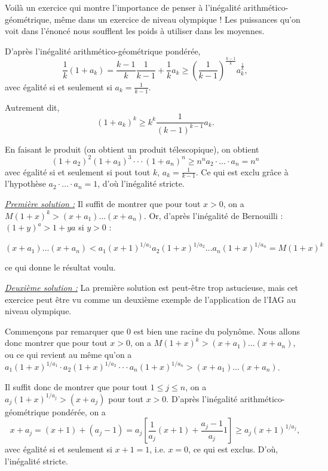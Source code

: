 \begin{sol}
Voilà un exercice qui montre l'importance de penser à l'inégalité arithmético-géométrique, même dans un exercice de niveau olympique ! Les puissances qu'on voit dans l'énoncé nous soufflent les poids à utiliser dans les moyennes.

D'après l'inégalité arithmético-géométrique pondérée,
$$
\frac1{k}(1+a_k) = \frac{k-1}{k} \frac1{k-1} + \frac1{k} a_k \ge \left(\frac1{k-1}\right)^{\frac{k-1}{k}}a_k^{\frac1{k}},
$$
avec égalité si et seulement si $a_k = \frac1{k-1}$.

Autrement dit,
$$
(1+a_k)^k \ge k^k \frac1{(k-1)^{k-1}} a_k.
$$

En faisant le produit (on obtient un produit télescopique), on obtient
$$(1+a_2)^2(1+a_3)^3 \cdot \cdot \cdot (1+a_n)^n \ge n^n a_2 \cdot \dots \cdot a_n = n^n$$
avec égalité si et seulement si pout tout $k$, $a_k = \frac1{k-1}$. Ce qui est exclu grâce à l'hypothèse $a_2 \cdot \dots \cdot a_n =1$, d'où l'inégalité stricte.
\end{sol}


\begin{sol}
\underline{\textit{Première solution :}}
Il suffit de montrer que pour tout $x>0$, on a $M(1+x)^k > (x+a_1) \ldots (x+a_n)$. Or, d'après l'inégalité de Bernouilli : $(1+y)^a > 1+ya$ si $y>0$ :

$$ (x+a_1) \ldots (x+a_n) < a_1(x+1)^{1/a_1} a_2 (1+x)^{1/a_2} \ldots a_n (1+x)^{1/a_n} = M(1+x)^k$$

ce qui donne le résultat voulu.

\underline{\textit{Deuxième solution :}}
La première solution est peut-être trop astucieuse, mais cet exercice peut être vu comme un deuxième exemple de l'application de l'IAG au niveau olympique.

Commençons par remarquer que $0$ est bien une racine du polynôme. Nous allons donc montrer que pour tout $x>0$, on a $M(1+x)^k > (x+a_1) \ldots (x+a_n)$, ou ce qui revient au même qu'on a $a_1(1+x)^{1/a_1} \cdot a_2(1+x)^{1/a_2} \cdot \cdot \cdot a_n(1+x)^{1/a_n} >(x+a_1) \ldots (x+a_n)$.

Il suffit donc de montrer que pour tout $1 \le j \le n$, on a $a_j(1+x)^{1/a_j} > (x+a_j)$ pour tout $x>0$. D'après l'inégalité arithmético-géométrique pondérée, on a
$$
x+a_j=(x+1)+(a_j-1)=a_j\left[\frac1{a_j}(x+1)+\frac{a_j-1}{a_j}1\right] \ge a_j(x+1)^{1/a_j},
$$
avec égalité si et seulement si $x+1=1$, i.e. $x=0$, ce qui est exclus. D'où, l'inégalité stricte.
\end{sol}


